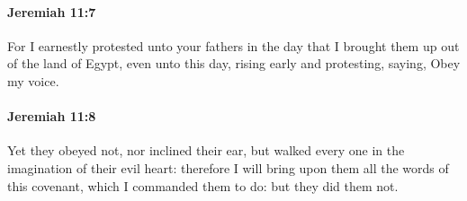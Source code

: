 		\paragraph{Jeremiah 11:7} %
			\label{JEREMIAH-11-7}

			For I earnestly protested unto your fathers in the day that I brought them up out of the land of Egypt, even unto this day, rising early and protesting, saying, Obey my voice.


		\paragraph{Jeremiah 11:8} %
			\label{JEREMIAH-11-8}

			Yet they obeyed not, nor inclined their ear, but walked every one in the imagination of their evil heart: therefore I will bring upon them all the words of this covenant, which I commanded them to do: but they did them not.

